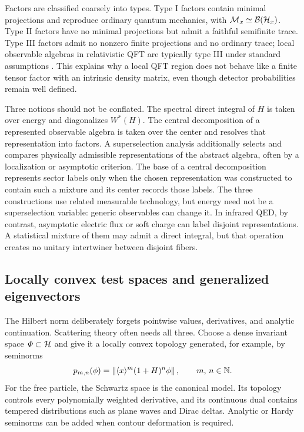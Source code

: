 Factors are classified coarsely into types.  Type I factors contain minimal
projections and reproduce ordinary quantum mechanics, with
$\mathcal{M}_x\simeq\mathcal{B}(\mathcal{H}_x)$.  Type II factors have no minimal
projections but admit a faithful semifinite trace.  Type III factors admit no
nonzero finite projections and no ordinary trace; local observable algebras in
relativistic QFT are typically type III under standard assumptions
\cite{Haag:1996}.  This explains why a local QFT region does not behave like
a finite tensor factor with an intrinsic density matrix, even though detector
probabilities remain well defined.

Three notions should not be conflated.  The spectral direct integral of
$H$ is taken over energy and diagonalizes $W^*(H)$.  The central decomposition
of a represented observable algebra is taken over the center and resolves
that representation into factors.  A superselection analysis additionally
selects and compares physically admissible representations of the abstract
algebra, often by a localization or asymptotic criterion.  The base of a
central decomposition represents sector labels only when the chosen
representation was constructed to contain such a mixture and its center
records those labels.  The three constructions use related measurable
technology, but energy need not be a superselection variable: generic
observables can change it.  In infrared QED, by contrast, asymptotic electric
flux or soft charge can label disjoint representations.  A statistical
mixture of them may admit a direct integral, but that operation creates no
unitary intertwiner between disjoint fibers.

\subsection{Locally convex test spaces and generalized eigenvectors}
\label{subsec:locally-convex-rhs-preview}

The Hilbert norm deliberately forgets pointwise values, derivatives, and
analytic continuation.  Scattering theory often needs all three.  Choose a
dense invariant space $\mathit{\Phi}\subset\mathcal{H}$ and give it a locally convex
topology generated, for example, by seminorms
\begin{equation}
  p_{m,n}(\phi)
  =\left\|\langle x \rangle^m
  (1+H)^n\phi\right\|,
  \qquad \text{$m$, $n\in\mathbb{N}$} .
  \label{eq:test-space-seminorms}
\end{equation}
For the free particle, the Schwartz space is the canonical model.  Its
topology controls every polynomially weighted derivative, and its continuous
dual contains tempered distributions such as plane waves and Dirac deltas.
Analytic or Hardy seminorms can be added when contour deformation is required.

